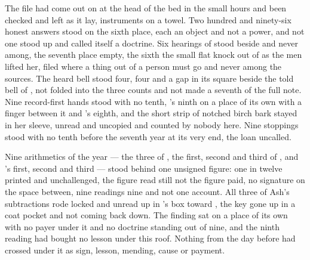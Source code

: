 The file had come out on  at the head of the bed in the small hours and been checked and left as it lay, instruments on a towel. Two hundred and ninety-six honest answers stood on the sixth place, each an object and not a power, and not one stood up and called itself a doctrine. Six hearings of  stood beside and never among, the seventh place empty, the sixth the small flat knock out of  as the men lifted her, filed where a thing out of a person must go and never among the sources. The heard bell stood four, four and a gap in its square beside the told bell of , not folded into the three counts and not made a seventh of the full note. Nine record-first hands stood with no tenth, 's ninth on a place of its own with a finger between it and 's eighth, and the short strip of notched birch bark stayed in her sleeve, unread and uncopied and counted by nobody here. Nine stoppings stood with no tenth before the seventh year at its very end, the loan uncalled.

Nine arithmetics of the year --- the three of , the first, second and third of , and 's first, second and third --- stood behind one unsigned figure: one in twelve printed and unchallenged, the figure read still not the figure paid, no signature on the space between, nine readings nine and not one account. All three of Ash's subtractions rode locked and unread up  in 's box toward , the key gone up in a coat pocket and not coming back down. The finding sat on a place of its own with no payer under it and no doctrine standing out of nine, and the ninth reading had bought no lesson under this roof. Nothing from the day before had crossed under it as sign, lesson, mending, cause or payment.

